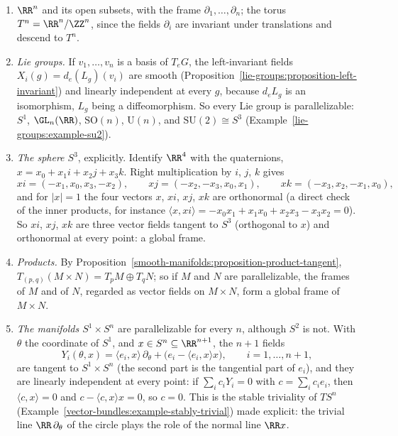 \begin{example}\label{vector-bundles:example-parallelizable}
\begin{enumerate}
\item $\RR^n$ and its open subsets, with the frame $\partial_1, \ldots, \partial_n$; the torus $T^n = \RR^n/\ZZ^n$, since the fields $\partial_i$ are invariant under translations and descend to $T^n$.
\item \emph{Lie groups.} If $v_1, \ldots, v_n$ is a basis of $T_eG$, the left-invariant fields $X_i(g) = d_e(L_g)(v_i)$ are smooth (Proposition~\ref{lie-groups:proposition-left-invariant}) and linearly independent at every
$g$, because $d_eL_g$ is an isomorphism, $L_g$ being a diffeomorphism. So every Lie group is parallelizable: $S^1$, $\GL_n(\RR)$, $\mathrm{SO}(n)$, $\mathrm{U}(n)$, and $\mathrm{SU}(2) \cong S^3$
(Example~\ref{lie-groups:example-su2}).
\item \emph{The sphere $S^3$}, explicitly. Identify $\RR^4$ with the quaternions, $x = x_0 + x_1i + x_2j + x_3k$. Right multiplication by $i$, $j$, $k$ gives
\[
xi = (-x_1, x_0, x_3, -x_2), \qquad xj = (-x_2, -x_3, x_0, x_1), \qquad xk = (-x_3, x_2, -x_1, x_0),
\]
and for $|x| = 1$ the four vectors $x$, $xi$, $xj$, $xk$ are orthonormal (a direct check of the inner products, for instance $\langle x, xi\rangle = -x_0x_1 + x_1x_0 + x_2x_3 - x_3x_2 = 0$). So $xi$, $xj$, $xk$ are
three vector fields tangent to $S^3$ (orthogonal to $x$) and orthonormal at every point: a global frame.
\item \emph{Products.} By Proposition~\ref{smooth-manifolds:proposition-product-tangent}, $T_{(p,q)}(M \times N) = T_pM \oplus T_qN$; so if $M$ and $N$ are parallelizable, the frames of $M$ and of $N$,
regarded as vector fields on $M \times N$, form a global frame of $M \times N$.
\item \emph{The manifolds $S^1 \times S^n$} are parallelizable for every $n$, although $S^2$ is not. With $\theta$ the coordinate of $S^1$, and $x \in S^n \subseteq \RR^{n+1}$, the $n + 1$ fields
\[
Y_i(\theta, x) = \langle e_i, x\rangle\,\partial_\theta + \bigl(e_i - \langle e_i, x\rangle x\bigr), \qquad i = 1, \ldots, n + 1,
\]
are tangent to $S^1 \times S^n$ (the second part is the tangential part of $e_i$), and they are linearly independent at every point: if $\sum_ic_iY_i = 0$ with $c = \sum_ic_ie_i$, then $\langle c, x\rangle = 0$ and
$c - \langle c, x\rangle x = 0$, so $c = 0$. This is the stable triviality of $TS^n$ (Example~\ref{vector-bundles:example-stably-trivial}) made explicit: the trivial line $\RR\,\partial_\theta$ of the circle plays the role of the
normal line $\RR x$.
\end{enumerate}
\end{example}

